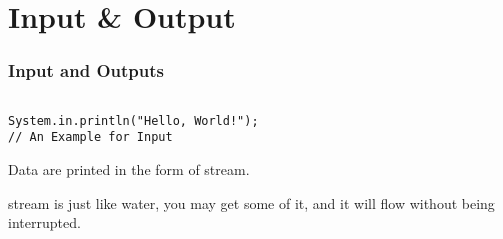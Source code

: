 \documentclass[en, 11pt, xcolor=dvipsnames]{beamer}
\begin{document}

\section{Input \& Output}
\begin{frame}[fragile]
	\frametitle{Input and Outputs}


	\begin{columns}[c]
		\begin{column}{0.9\textwidth}

			\begin{lstlisting}
System.in.println("Hello, World!");
// An Example for Input\end{lstlisting}

			Data are printed in the form of stream.

			stream is just like water, you may get some of it,
			and it will flow without being interrupted.


		\end{column}
	\end{columns}

\end{frame}
\end{document}
